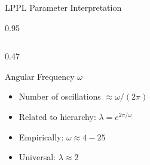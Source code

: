 \documentclass[9pt, aspectratio=169, t]{beamer}
\begin{document}
\begin{frame}{LPPL Parameter Interpretation}
\begin{cminipage}{0.95\textwidth}
{\begin{columns}[T]
\begin{column}{0.47\textwidth}
            \begin{block}{Angular Frequency $\omega$}
                \begin{itemize}\setlength{\itemsep}{0pt}
                    \item Number of oscillations $\approx \omega/(2\pi)$
                    \item Related to hierarchy: $\lambda = e^{2\pi/\omega}$
                    \item Empirically: $\omega \approx 4 - 25$
                    \item Universal: $\lambda \approx 2$
                \end{itemize}
            \end{block}
        \end{column}
    \end{columns}
    }
    \end{cminipage}
\end{frame}
\end{document}
